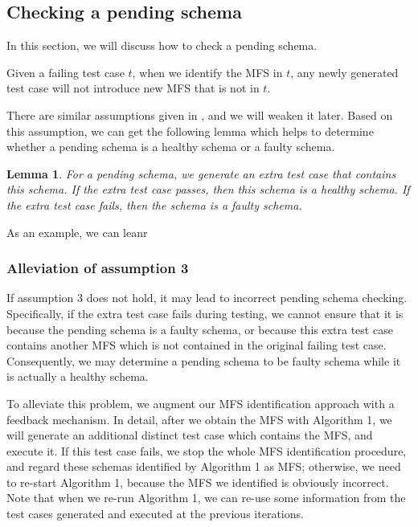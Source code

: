 \documentclass{sig-alternate-05-2015}
\begin{document}
{{\subsection{Checking a pending schema}
In this section, we will discuss how to check a pending schema.

\begin{assumption}
Given a failing test case $t$, when we identify the MFS in $t$, any newly generated test case will not introduce new MFS that is not in $t$.
\end{assumption}

There are similar assumptions given in \cite{zhang2011characterizing,martinez2008algorithms,martinez2009locating}, and we will weaken it later. Based on this assumption, we can get the following lemma which helps to determine whether a pending schema is a healthy schema or a faulty schema.
\newtheorem{lemma}{Lemma}
\begin{lemma}
For a pending schema, we generate an extra test case that contains this schema. If the extra test case passes, then this schema is a healthy schema. If the extra test case fails, then the schema is a faulty schema.
\end{lemma}
%

As an example, we can leanr

\subsubsection{Alleviation of assumption 3}

If assumption 3 does not hold, it may lead to incorrect pending schema checking. Specifically, if the extra test case fails during testing, we cannot ensure that it is because the pending schema is a faulty schema, or because this extra test case contains another MFS which is not contained in the original failing test case. Consequently, we may determine a pending schema to be faulty schema while it is actually a healthy schema.

To alleviate this problem, we augment our MFS identification approach with a feedback mechanism. In detail, after we obtain the MFS with Algorithm 1, we will generate an additional distinct test case which contains the MFS, and execute it. If this test case fails, we stop the whole MFS identification procedure, and regard these schemas identified by Algorithm 1 as MFS; otherwise, we need to re-start Algorithm 1, because the MFS we identified is obviously incorrect. Note that when we re-run Algorithm 1, we can re-use some information from the test cases generated and executed at the previous iterations.

}}
\end{document}
